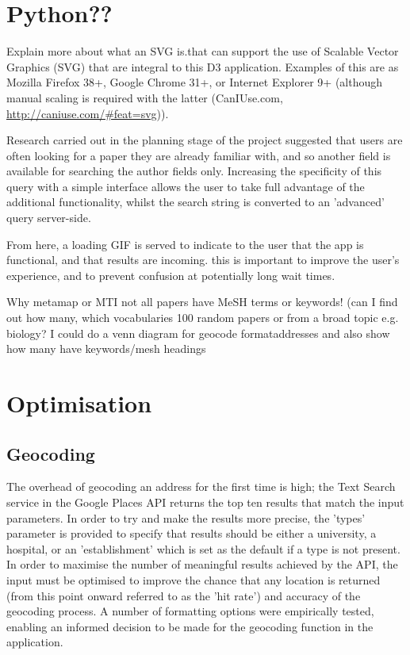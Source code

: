 \documentclass[Report.tex]{subfiles}
\begin{document}
\section{Python??}
Explain more about what an SVG is.that can support the use of Scalable Vector Graphics (SVG) that are integral to this D3 application. Examples of this are as Mozilla Firefox 38+, Google Chrome 31+, or Internet Explorer 9+ (although manual scaling is required with the latter (CanIUse.com, \url{http://caniuse.com/#feat=svg})).

Research carried out in the planning stage of the project suggested that users are often looking for a paper they are already familiar with, and so another field is available for searching the author fields only. Increasing the specificity of this query with a simple interface allows the user to take full advantage of the additional functionality, whilst the search string is converted to an 'advanced' query server-side.

From here, a loading GIF is served to indicate to the user that the app is functional, and that results are incoming. this is important to improve the user's experience, and to prevent confusion at potentially long wait times.

Why metamap or MTI not all papers have MeSH terms or keywords! (can I find out how many, which vocabularies 100 random papers or from a broad topic e.g. biology? I could do a venn diagram for geocode formataddresses and also show how many have keywords/mesh headings

\section{Optimisation}
\subsection{Geocoding}
The overhead of geocoding an address for the first time is high; the Text Search service in the Google Places API returns the top ten results that match the input parameters. In order to try and make the results more precise, the 'types' parameter is provided to specify that results should be either a university, a hospital, or an 'establishment' which is set as the default if a type is not present. In order to maximise the number of meaningful results achieved by the API, the input must be optimised to improve the chance that any location is returned (from this point onward referred to as the 'hit rate') and accuracy of the geocoding process. A number of formatting options were empirically tested, enabling an informed decision to be made for the geocoding function in the application.\newline
\end{document}
